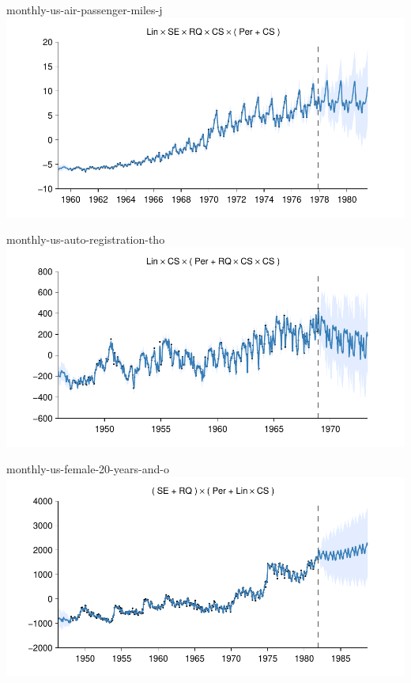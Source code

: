     
\begin{frame}{monthly-us-air-passenger-miles-j}
  \center
  \includegraphics[width=1.0\textwidth]{figures/monthly-us-air-passenger-miles-j/monthly-us-air-passenger-miles-j_all}
\end{frame}  


    
\begin{frame}{monthly-us-auto-registration-tho}
  \center
  \includegraphics[width=1.0\textwidth]{figures/monthly-us-auto-registration-tho/monthly-us-auto-registration-tho_all}
\end{frame}  


    
\begin{frame}{monthly-us-female-20-years-and-o}
  \center
  \includegraphics[width=1.0\textwidth]{figures/monthly-us-female-20-years-and-o/monthly-us-female-20-years-and-o_all}
\end{frame}  


